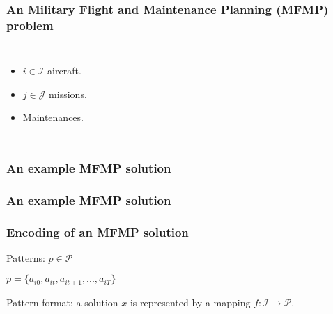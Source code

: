 \begin{frame}
\frametitle{\textbf{An Military Flight and Maintenance Planning (MFMP) problem}}

  \begin{columns}[c]

    \pause
    \begin{itemize}[<+->]
      \item $i \in \mathcal{I}$ aircraft.
      \item $j \in \mathcal{J}$ missions.
      \item Maintenances.
    \end{itemize}

  \end{columns}

\end{frame}

\begin{frame}
\frametitle{\textbf{An example MFMP solution}}
  
\end{frame}

\begin{frame}
\frametitle{\textbf{An example MFMP solution}}
  
\end{frame}

\begin{frame}
\frametitle{\textbf{Encoding of an MFMP solution}}

  Patterns: \(p \in \mathcal{P}\)

  \(p = \{a_{i0}, a_{it}, a_{it+1}, ..., a_{iT}\}\)

  Pattern format: a solution \(x\) is represented by a mapping
  \(f: \mathcal{I} \to \mathcal{P}\).
\end{frame}
